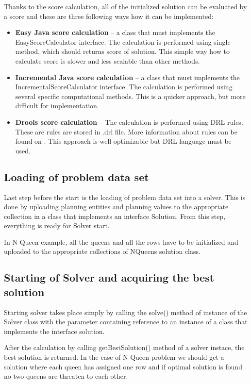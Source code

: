 Thanks to the score calculation, all of the initialized solution can be evaluated by a score and these are three following ways how it can be implemented:

\begin{itemize}
\item \textbf{Easy Java score calculation} -- a class that must implements the EasyScoreCalculator interface. The calculation is performed using single method, which should returns score of solution. This simple way how to calculate score is slower and less scalable than other methods.
\item \textbf{Incremental Java score calculation} -- a class that must implements the IncrementalScoreCalculator interface. The calculation is performed using several specific computational methods. This is a quicker approach, but more difficult for implementation.
\item \textbf{Drools score calculation} -- The calculation is performed using DRL rules. These are rules are stored in .drl file. More information about rules can be found on \cite{DroolsBook}. This approach is well optimizable but DRL language must be used.
\end{itemize}

\subsection{Loading of problem data set}
Last step before the start is the loading of problem data set into a solver. This is done by uploading planning entities and planning values to the appropriate collection in a class that implements an interface Solution. From this step, everything is ready for Solver start.

In N-Queen example, all the queens and all the rows have to be initialized and uploaded to the appropriate collections of NQueens solution class.

\subsection{Starting of Solver and acquiring the best solution}
Starting solver takes place simply by calling the solve() method of instance of the Solver class with the parameter containing reference to an instance of a class that implements the interface solution.

After the calculation by calling getBestSolution() method of a solver instace, the best solution is returned. In the case of N-Queen problem we should get a solution where each queen has assigned one row and if optimal solution is found no two queens are threaten to each other.


